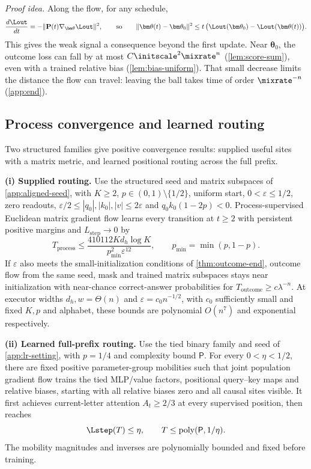 \emph{Proof idea.} Along the flow, for any schedule,
\[
 \frac{d\Lout}{dt}=-\|\mathbf P(t)\nabla_{\bm\theta}\Lout\|^2,
 \qquad\text{so}\qquad
 \|\bm\theta(t)-\bm\theta_0\|^2\le t\,\bigl(\Lout(\bm\theta_0)-\Lout(\bm\theta(t))\bigr).
\]
This gives the weak signal a consequence beyond the first update. Near $\bm\theta_0$, the outcome loss can fall by at most
$C\initscale^2\mixrate^n$ (\cref{lem:score-sum}), even with a trained relative bias (\cref{lem:bias-uniform}). That small decrease limits
the distance the flow can travel: leaving the ball takes time of order $\mixrate^{-n}$ (\cref{app:end}).

\subsection{Process convergence and learned routing}
\label{sec:aligned-transformer}
Two structured families give positive convergence results: supplied useful sites
with a matrix metric, and learned positional routing across the full prefix.
\begin{theorem}
\label{thm:aligned-transformer}
\textbf{(i) Supplied routing.} Use the structured seed and matrix subspaces of \cref{app:aligned-seed}, with
$K\ge2$, $p\in(0,1)\setminus\{1/2\}$, uniform start, $0<\varepsilon\le1/2$,
zero readouts, $\varepsilon/2\le|q_0|,|k_0|,|v|\le2\varepsilon$ and
$q_0k_0(1-2p)<0$. Process-supervised Euclidean matrix gradient flow learns
every transition at $t\ge2$ with persistent positive margins and
$L_{\mathrm{step}}\to0$ by
\[
 T_{\mathrm{process}}\le
 \frac{410112K d_h\log K}{p_{\min}^2\varepsilon^{12}},
 \qquad p_{\min}=\min(p,1-p).
\]
If $\varepsilon$ also meets the small-initialization conditions of
\cref{thm:outcome-end}, outcome flow from the same seed, mask and trained
matrix subspaces stays near initialization with near-chance correct-answer
probabilities for $T_{\mathrm{outcome}}\ge c\lambda^{-n}$.
At executor widths $d_h,w=\Theta(n)$ and $\varepsilon=c_0n^{-1/2}$, with $c_0$
sufficiently small and fixed $K,p$ and alphabet, these bounds are polynomial $O(n^7)$
and exponential respectively.

\textbf{(ii) Learned full-prefix routing.} Use the tied binary family and seed of
\cref{app:lr-setting}, with $p=1/4$ and complexity bound $\mathsf P$.
For every $0<\eta<1/2$, there are fixed positive parameter-group
mobilities such that joint population gradient flow trains the tied MLP/value
factors, positional query--key maps and relative biases, starting with all relative
biases zero and all causal sites visible. It first achieves current-letter
attention $A_t\ge2/3$ at every supervised position, then reaches
\[
 \Lstep(T)\le \eta,\qquad
 T\le\operatorname{poly}(\mathsf P,1/\eta).
\]
The mobility magnitudes and inverses are polynomially bounded and fixed before training.
\end{theorem}
